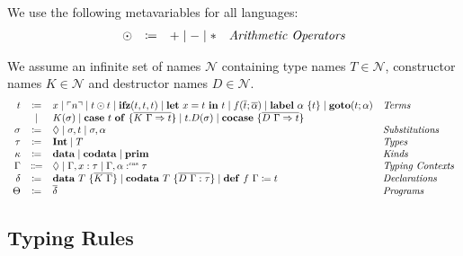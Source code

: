 \begin{definition}
  We use the following metavariables for all languages:
  \[
    \begin{array}{rcll}
      \odot  & \coloneqq & + \mid - \mid * & \emph{Arithmetic Operators}
    \end{array}
  \]
\end{definition}

\begin{definition}
  We assume an infinite set of names $\mathcal{N}$ containing type names $T\in\mathcal{N}$, constructor names $K\in\mathcal{N}$ and destructor names $D\in\mathcal{N}$.
  \[ 
    \begin{array}{r c l l}
      t & \coloneqq & x \mid \lit{n} \mid t \odot t \mid \ifz{t}{t}{t} \mid \letin{x}{t}{t} \mid f(\overline{t}; \overline{\alpha}) \mid \lab{\alpha}{t} \mid \goto{t}{\alpha} & \emph{Terms}\\
      & \mid & K(\sigma) \mid \caseof{t}{\overline{K\ \Gamma \Rightarrow t}} \mid t.D(\sigma) \mid \cocase{\overline{D\ \Gamma \Rightarrow t}} & \\
      \sigma & \coloneqq & \nil \mid \sigma,t \mid \sigma, \alpha & \emph{Substitutions}\\
      \tau & \coloneqq & \tyint \mid T & \emph{Types} \\
      \kappa & \coloneq & \mathbf{data} \mid \mathbf{codata} \mid \mathbf{prim} & \emph{Kinds} \\
      \Gamma & \Coloneqq & \nil \mid \Gamma, x : \tau \mid \Gamma, \alpha \cnt \tau & \emph{Typing Contexts} \\
      \delta & \coloneqq & \mathbf{data}\ T\ \{ \overline{K\ \Gamma} \}  \mid \mathbf{codata}\ T\ \{ \overline{D\ \Gamma : \tau}\} \mid \defi{f\ \Gamma}{t} & \emph{Declarations}\\
      \Theta & \coloneqq & \overline{\delta} & \emph{Programs}\\
    \end{array}
  \]
\end{definition}

\subsection{Typing Rules}
\label{subsec:fun:typing-rules}


